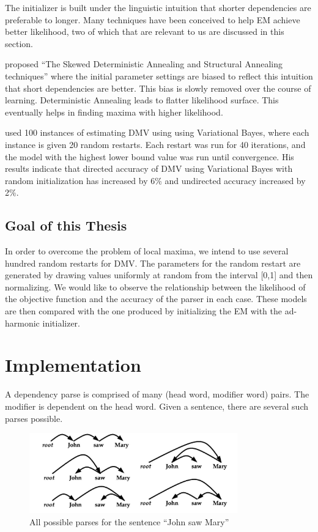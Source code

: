 \documentclass{book}
\begin{document}
The initializer is built under the linguistic intuition that shorter dependencies are preferable to longer. Many techniques have been conceived to help EM achieve better likelihood, two of which that are relevant to us are discussed in this section.

\citep{smith2006} proposed ``The Skewed Deterministic Annealing and Structural Annealing techniques'' where the initial parameter settings are biased to reflect this intuition that short dependencies are better. This bias is slowly removed over the course of learning. Deterministic Annealing leads to flatter likelihood surface. This eventually helps in finding maxima with higher likelihood.

\citep{headden2009} used 100 instances of estimating DMV using using Variational Bayes, where each instance is given 20 random restarts. Each restart was run for 40 iterations, and the model with the highest lower bound value was run until convergence. His results indicate that directed accuracy of DMV using Variational Bayes with random initialization has increased by 6\% and undirected accuracy increased by 2\%.

\section{Goal of this Thesis}

 In order to overcome the problem of local maxima, we intend to use several hundred random restarts for DMV. The parameters for the random restart are generated by drawing values uniformly at random from the interval [0,1] and then normalizing.  We would like to observe the relationship between the likelihood of the objective function and the accuracy of the parser in each case. These models are then compared with the one produced by initializing the EM with the ad-harmonic initializer.

\chapter{Implementation}
A dependency parse is comprised of many (head word, modifier word) pairs. The modifier is dependent on the head word. Given a sentence, there are several such parses possible.

\begin{figure}[!ht]
\centering
\includegraphics[width=90mm]{images/rsz_all_deps.jpg}
\caption{All possible parses for the sentence ``John saw Mary''}
\label{overflow}
\end{figure}
\end{document}
